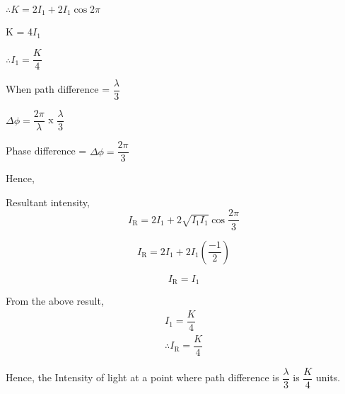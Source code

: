 \documentclass[journal,12pt,twocolumn]{IEEEtran}
\theoremstyle{remark}
\begin{document}
$\therefore K = 2I_1 +2I_1\cos{2\pi}$

\vspace{0.2cm}

        \hspace*{0.4cm}    K = 4$I_1$

\vspace{0.2cm}

      \hspace{1cm}  $\therefore    I_1=\dfrac{K}{4}$

\vspace{1cm}

When path difference = $\dfrac{\lambda}{3}$

\vspace{0.2cm}

\hspace{1cm}$\Delta \phi = \dfrac{2\pi}{\lambda}$  x $ \dfrac{\lambda}{3}$

\vspace{0.2cm}

Phase difference = $ \Delta \phi = \dfrac{2\pi}{3} $

Hence,

\hspace*{0.5cm}Resultant intensity,
\[I_{\text{R}} = 2I_1 + 2\sqrt{I_1I_1}\cos{\dfrac{2\pi}{3}}\]

\[I_{\text{R}}= 2I_1 + 2I_1\left(\dfrac{-1}{2}\right)\]

\[I_{\text{R}} = I_1\]

From the above result,
\hspace*{0.5cm}
\begin{align*}
I_1 = \dfrac{K}{4}\\
\therefore I_{\text{R}} = \dfrac{K}{4}
\end{align*}

Hence, the Intensity of light at a point where path difference is $\dfrac{\lambda}{3}$ is $\dfrac{K}{4}$ units.


\end{document}
